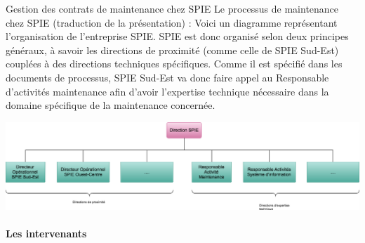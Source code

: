 
Gestion des contrats de maintenance chez SPIE
Le processus de maintenance chez SPIE (traduction de la présentation) :
Voici un diagramme représentant l'organisation de l'entreprise SPIE. SPIE est donc organisé selon deux principes généraux, à savoir les directions de proximité (comme celle de SPIE Sud-Est) couplées à des directions techniques spécifiques. Comme il est spécifié dans les documents de processus, SPIE Sud-Est va donc faire appel au Responsable d'activités maintenance afin d'avoir l'expertise technique nécessaire dans la domaine spécifique de la maintenance concernée.

\begin {center}
\includegraphics[width=\textwidth]{png_generaux/DiagrammeOrganisationnelSPIE.png}
\end {center}

\paragraph{Les intervenants}

